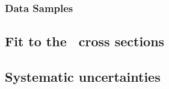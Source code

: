 \subsubsection{Data Samples}
\label{subsec:aspdffitdata}


\subsection{Fit to the \dsdetjetb~cross sections}
\label{subsec:doubledifasfit}



\subsection{Systematic uncertainties}
\label{subsec:assysunc}

